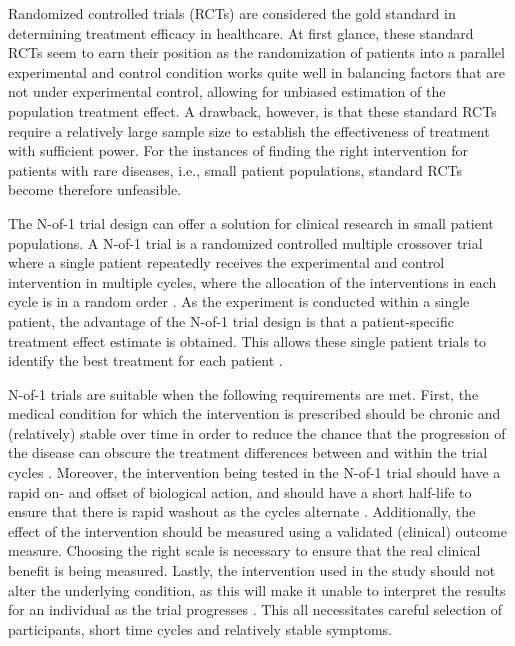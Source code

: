 \documentclass[AMA,STIX1COL,]{WileyNJD-v2}
\begin{document}
Randomized controlled trials (RCTs) are considered the gold standard in determining treatment efficacy in healthcare. At first glance, these standard RCTs seem to earn their position as the randomization of patients into a parallel experimental and control condition works quite well in balancing factors that are not under experimental control, allowing for unbiased estimation of the population treatment effect. A drawback, however, is that these standard RCTs require a relatively large sample size to establish the effectiveness of treatment with sufficient power. For the instances of finding the right intervention for patients with rare diseases, i.e., small patient populations, standard RCTs become therefore unfeasible.

The N-of-1 trial design can offer a solution for clinical research in small patient populations. A N-of-1 trial is a randomized controlled multiple crossover trial where a single patient repeatedly receives the experimental and control intervention in multiple cycles, where the allocation of the interventions in each cycle is in a random order \citep{guyatt1986}. As the experiment is conducted within a single patient, the advantage of the N-of-1 trial design is that a patient-specific treatment effect estimate is obtained. This allows these single patient trials to identify the best treatment for each patient \citep{kravitz2004}.

N-of-1 trials are suitable when the following requirements are met. First, the medical condition for which the intervention is prescribed should be chronic and (relatively) stable over time in order to reduce the chance that the progression of the disease can obscure the treatment differences between and within the trial cycles \citep{johnston2004, nikles2011}. Moreover, the intervention being tested in the N-of-1 trial should have a rapid on- and offset of biological action, and should have a short half-life to ensure that there is rapid washout as the cycles alternate \citep{nikles2011}. Additionally, the effect of the intervention should be measured using a validated (clinical) outcome measure. Choosing the right scale is necessary to ensure that the real clinical benefit is being measured. Lastly, the intervention used in the study should not alter the underlying condition, as this will make it unable to interpret the results for an individual as the trial progresses \citep{nikles2011}. This all necessitates careful selection of participants, short time cycles and relatively stable symptoms.
\end{document}
